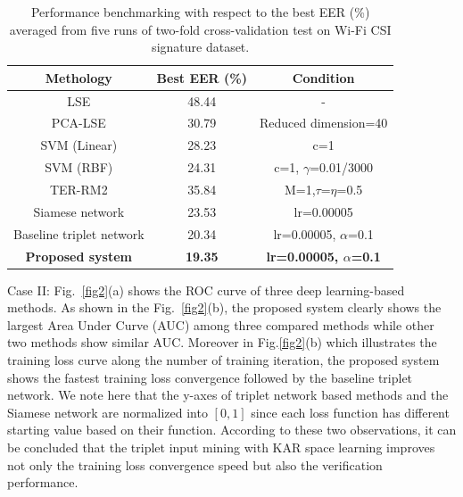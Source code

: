 \documentclass[runningheads]{llncs}
\begin{document}
\begin{table}[!h]
    \caption{Performance benchmarking with respect to the best EER (\%) averaged from five runs of two-fold cross-validation test on Wi-Fi CSI signature dataset.}\label{tab3}
    \centering
    \begin{tabular}{|c|c|c|}
    \hline
    Methology   &   Best EER (\%) &   Condition   \\  \hline
    LSE &   48.44   &  - \\ 
    PCA-LSE    &   30.79   &  Reduced dimension=40    \\
    SVM (Linear) &   28.23   &   c=1 \\
    SVM (RBF)    &   24.31   &   c=1, $\gamma$=0.01/3000 \\
    TER-RM2 &   35.84   &  M=1,$\tau$=$\eta$=0.5   \\     \hline
    Siamese network  &   23.53   &   lr=0.00005  \\
    Baseline triplet network &   20.34   &   lr=0.00005, $\alpha$=0.1  \\
    \textbf{Proposed system} &   \textbf{19.35}   &  \textbf{lr=0.00005, $\alpha$=0.1}  \\
     \hline
    \end{tabular}
\end{table}

Case II: Fig.~\ref{fig2}(a) shows the ROC curve of three deep learning-based methods. As shown in the Fig.~\ref{fig2}(b), the proposed system clearly shows the largest Area Under Curve (AUC) among three compared methods while other two methods show similar AUC. Moreover in Fig.\ref{fig2}(b) which illustrates the training loss curve along the number of training iteration, the proposed system shows the fastest training loss convergence followed by the baseline triplet network. We note here that the y-axes of triplet network based methods and the Siamese network are normalized into $[0,1]$ since each loss function has different starting value based on their function. According to these two observations, it can be concluded that the triplet input mining with KAR space learning improves not only the training loss convergence speed but also the verification performance.
\end{document}
